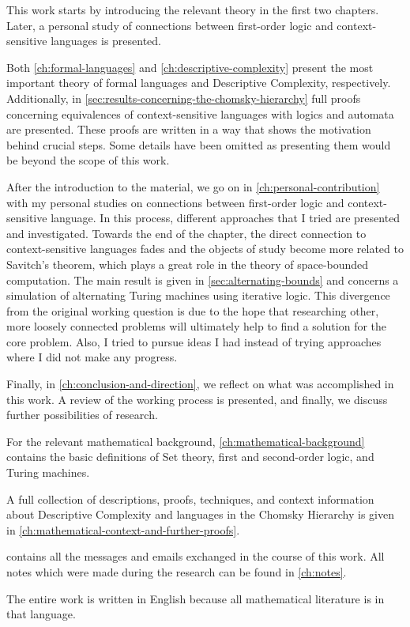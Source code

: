 
This work starts by introducing the relevant theory in the first two chapters.
Later, a personal study of connections between first-order logic and context-sensitive languages is presented.

Both \cref{ch:formal-languages} and \cref{ch:descriptive-complexity} present the most important theory of formal languages and Descriptive Complexity, respectively.
Additionally, in \cref{sec:results-concerning-the-chomsky-hierarchy} full proofs concerning equivalences of context-sensitive languages with logics and automata are presented.
These proofs are written in a way that shows the motivation behind crucial steps.
Some details have been omitted as presenting them would be beyond the scope of this work.

After the introduction to the material, we go on in \cref{ch:personal-contribution} with my personal studies on connections between first-order logic and context-sensitive language.
In this process, different approaches that I tried are presented and investigated.
Towards the end of the chapter, the direct connection to context-sensitive languages fades and the objects of study become more related to Savitch's theorem, which plays a great role in the theory of space-bounded computation.
The main result is given in \cref{sec:alternating-bounds} and concerns a simulation of alternating Turing machines using iterative logic.
This divergence from the original working question is due to the hope that researching other, more loosely connected problems will ultimately help to find a solution for the core problem.
Also, I tried to pursue ideas I had instead of trying approaches where I did not make any progress.

Finally, in \cref{ch:conclusion-and-direction}, we reflect on what was accomplished in this work.
A review of the working process is presented, and finally, we discuss further possibilities of research.

For the relevant mathematical background, \cref{ch:mathematical-background} contains the basic definitions of Set theory, first and second-order logic, and Turing machines.

A full collection of descriptions, proofs, techniques, and context information about Descriptive Complexity and languages in the Chomsky Hierarchy is given in \cref{ch:mathematical-context-and-further-proofs}.

 contains all the messages and emails exchanged in the course of this work.
All notes which were made during the research can be found in \cref{ch:notes}.

The entire work is written in English because all mathematical literature is in that language. %



